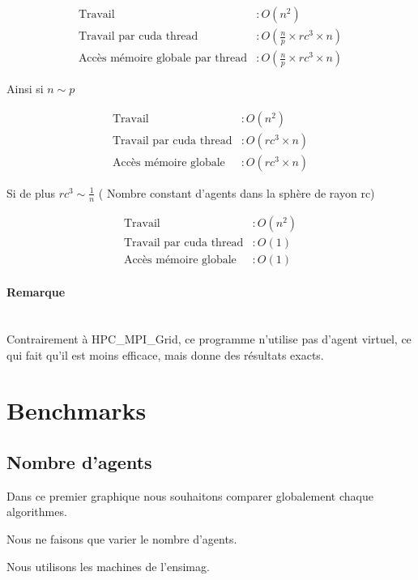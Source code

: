 \documentclass[liens,entete-ensimag,margeCorrection]{ensirapport}
\begin{document}
\begin{align*}
    \text{Travail} &: O\left( n^2 \right) \\
    \text{Travail par cuda thread} &: O\left( \frac n p \times rc^3 \times n \right)  \\
    \text{Accès mémoire globale par thread} &: O\left( \frac n p \times rc^3 \times n \right)
\end{align*}

Ainsi si $n \sim p$

\begin{align*}
    \text{Travail} &: O\left( n^2 \right) \\
    \text{Travail par cuda thread} &: O\left( rc^3 \times n \right)  \\
    \text{Accès mémoire globale} &: O\left( rc^3 \times n \right)
\end{align*}

Si de plus  $ rc^3 \sim \frac 1n$  ( Nombre constant d'agents dans la sphère de rayon rc)

\begin{align*}
    \text{Travail} &: O\left( n^2 \right) \\
    \text{Travail par cuda thread} &: O\left( 1 \right)  \\
    \text{Accès mémoire globale} &: O\left( 1\right)
\end{align*}

\paragraph{Remarque}~\\
Contrairement à HPC\_MPI\_Grid, ce programme n'utilise pas d'agent virtuel, ce qui fait qu'il est moins efficace, mais donne des résultats exacts.

\section{Benchmarks}

\subsection{Nombre d'agents}

Dans ce premier graphique nous souhaitons comparer globalement chaque algorithmes.

Nous ne faisons que varier le nombre d'agents.

Nous utilisons les machines de l'ensimag.
\end{document}
